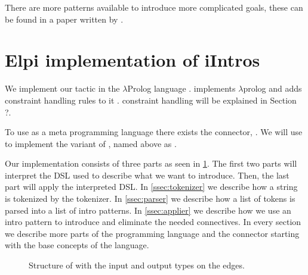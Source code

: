 \documentclass[thesis.tex]{subfiles}
\begin{document}
{{There are more patterns available to introduce more complicated goals, these can be found in a paper written by  \cite{krebbersInteractiveProofsHigherorder2017}.

\section{Elpi implementation of iIntros}
We implement our tactic in the $\lambda$Prolog language \elpi \cite{dunchevELPIFastEmbeddable2015,guidiImplementingTypeTheory2019}. \elpi implements $\lambda$prolog \cite{millerHigherorderLogicProgramming1986,millerUniformProofsFoundation1991,belleanneePragmaticReconstructionLProlog1999,millerProgrammingHigherOrderLogic2012} and adds constraint handling rules to it \cite{monfroyConstraintHandlingRules2011}. constraint handling will be explained in Section ?.

To use \elpi as a \coq meta programming language there exists the \elpi \coq connector, \ce \cite{tassiElpiExtensionLanguage2018}. We will use \ce to implement the \elpi variant of , named above as .

Our \elpi implementation  consists of three parts as seen in \cref{fig:eiintrosstruct}. The first two parts will interpret the DSL used to describe what we want to introduce. Then, the last part will apply the interpreted DSL. In \cref{ssec:tokenizer} we describe how a string is tokenized by the tokenizer. In \cref{ssec:parser} we describe how a list of tokens is parsed into a list of intro patterns. In \cref{ssec:applier} we describe how we use an intro pattern to introduce and eliminate the needed connectives. In every section we describe more parts of the \elpi programming language and the \ce connector starting with the base concepts of the language.
\begin{figure}
  \centering
  \caption{Structure of  with the input and output types on the edges.}
  \label{fig:eiintrosstruct}
\end{figure}

}}
\end{document}
